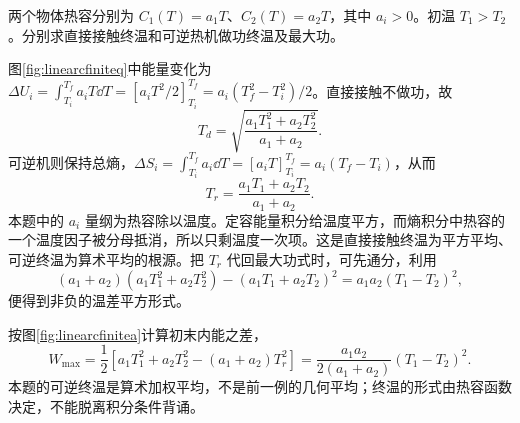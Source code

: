 \begin{example}[热容随温度改变的有限热源]
两个物体热容分别为 $C_1(T)=a_1T$、$C_2(T)=a_2T$，其中 $a_i>0$。初温 $T_1>T_2$。分别求直接接触终温和可逆热机做功终温及最大功。
\end{example}
\begin{solution}
图\ref{fig:linearcfiniteq}中能量变化为$\Delta U_i=\int_{T_i}^{T_f}a_iT\dd T=[a_iT^2/2]_{T_i}^{T_f}=a_i(T_f^2-T_i^2)/2$。直接接触不做功，故
\[
 T_d=\sqrt{\frac{a_1T_1^2+a_2T_2^2}{a_1+a_2}}.
\]
可逆机则保持总熵，$\Delta S_i=\int_{T_i}^{T_f}a_i\dd T=[a_iT]_{T_i}^{T_f}=a_i(T_f-T_i)$，从而
\[
 T_r=\frac{a_1T_1+a_2T_2}{a_1+a_2}.
\]
本题中的 $a_i$ 量纲为热容除以温度。定容能量积分给温度平方，而熵积分中热容的一个温度因子被分母抵消，所以只剩温度一次项。这是直接接触终温为平方平均、可逆终温为算术平均的根源。把 $T_r$ 代回最大功式时，可先通分，利用
\[
 (a_1+a_2)(a_1T_1^2+a_2T_2^2)
 -(a_1T_1+a_2T_2)^2=a_1a_2(T_1-T_2)^2,
\]
便得到非负的温差平方形式。

按图\ref{fig:linearcfinitea}计算初末内能之差，
\[
 W_{\max}=\frac12[a_1T_1^2+a_2T_2^2-(a_1+a_2)T_r^2]
 =\frac{a_1a_2}{2(a_1+a_2)}(T_1-T_2)^2.
\]
本题的可逆终温是算术加权平均，不是前一例的几何平均；终温的形式由热容函数决定，不能脱离积分条件背诵。
\end{solution}

